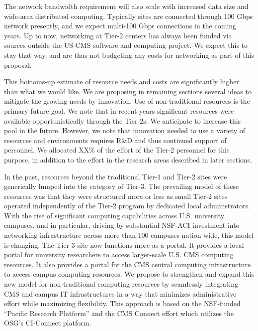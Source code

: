 \documentclass[11pt,a4paper]{article}
\begin{document}
The network bandwidth requirement will also scale with increased data
size and wide-area distributed computing.  Typically sites are
connected through 100 Gbps network presently, and we expect
multi-100 Gbps connections in the coming years. Up to now, networking at Tier-2 centers has always been funded
via sources outside the US-CMS software and computing project. We expect this to stay that way, and are thus not budgeting
any costs for networking as part of this proposal.

This bottoms-up estimate of resource needs and costs are significantly
higher than what we would like. We are proposing in remaining sections
several ideas to mitigate the growing needs by innovation.  Use of
non-traditional resources is the primary future goal.  We note that
in recent years significant resources were available opportunistically
through the Tier-2s.  We anticipate to increase this pool in the future.
However, we note that innovation needed to use a variety of resources
and environments requires R\&D and thus continued support of  personnel.
We allocated XX\% of the effort of the Tier-2 personnel for this
purpose, in addition to the effort in the research areas described
in later sections.


In the past, resources beyond the traditional Tier-1 and Tier-2 sites were generically lumped into the category of Tier-3.  The prevailing model of these resources was that they were structured more or less as small Tier-2 sites operated independently of the Tier-2 program by dedicated local administrators.  With the rise of significant computing capabilities across U.S. university campuses, and in particular, driving by substantial NSF-ACI investment into networking infrastructure across more than 100 campuses nation wide, this model is changing.  The Tier-3 site now functions more as a portal.  It provides a local portal for university researchers to access larger-scale U.S. CMS computing resources.  It also provides a portal for the CMS central computing infrastructure to access campus computing resources.  We propose to strengthen and expand this new model for non-traditional computing resources by seamlessly integrating CMS and campus IT infrastructures in a way that minimizes administrative effort while maximizing flexibility.  This approach is based on the NSF-funded ``Pacific Research Platform'' and the CMS Connect effort which utilizes the OSG's CI-Connect platform.
\end{document}
